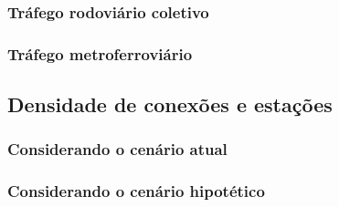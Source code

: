 \documentclass[
article,			%
11pt,				%
oneside,			%
a4paper,			%
english,			%
brazil,				%
sumario=tradicional
]{abntex2}
\begin{document}
	\subsubsection{Tráfego rodoviário coletivo} \label{s3:coletivofuturo}
	
	\subsubsection{Tráfego metroferroviário} \label{s3:metrofuturo}
	
	\subsection{Densidade de conexões e estações} \label{s2:densidadeconexoes}
	
	\subsubsection{Considerando o cenário atual} \label{s3:densidadeatual}
	
	\subsubsection{Considerando o cenário hipotético} \label{s3:densidadefuturo}
	
	
%	
%	
	\postextual
	
	
	
	\renewcommand{\glossaryname}{Glossário}
	\renewcommand*{\glsseeformat}[3][\seename]{\textit{#1}
		\glsseelist{#2}}
	
\end{document}
